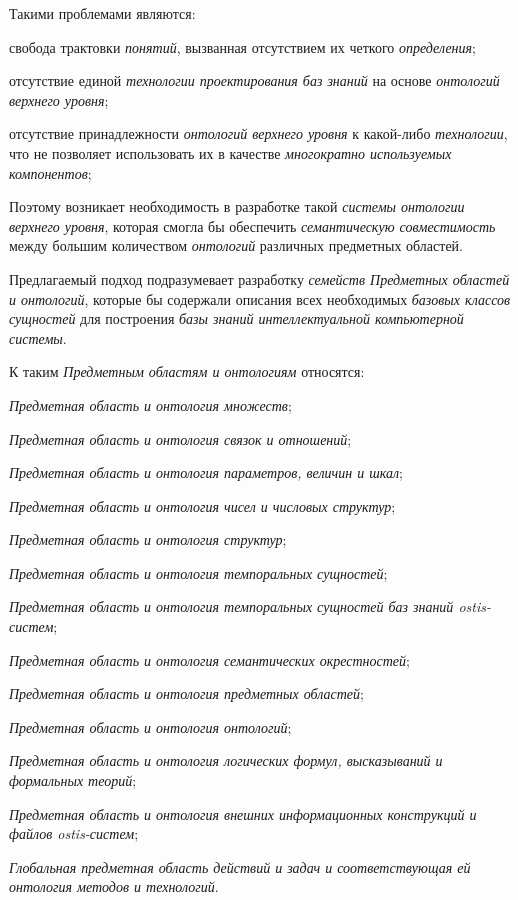 Такими проблемами являются:
\begin{textitemize}
    \item свобода трактовки \textit{понятий}, вызванная отсутствием их четкого \textit{определения};
    \item отсутствие единой \textit{технологии проектирования баз знаний} на основе \textit{онтологий верхнего уровня};
    \item отсутствие принадлежности \textit{онтологий верхнего уровня} к какой-либо \textit{технологии}, что не позволяет использовать их в качестве \textit{многократно используемых компонентов};
\end{textitemize}

Поэтому возникает необходимость в разработке такой \textit{системы онтологии верхнего уровня}, которая смогла бы обеспечить \textit{семантическую совместимость} между большим количеством \textit{онтологий} различных предметных областей.

Предлагаемый подход подразумевает разработку \textit{семейств Предметных областей и онтологий}, которые бы содержали описания всех необходимых \textit{базовых классов сущностей} для построения \textit{базы знаний интеллектуальной компьютерной системы}.

К таким \textit{Предметным областям и онтологиям} относятся:

\begin{textitemize}
\item \textit{Предметная область и онтология множеств};
\item \textit{Предметная область и онтология связок и отношений};
\item \textit{Предметная область и онтология параметров, величин и шкал};
\item \textit{Предметная область и онтология чисел и числовых структур};
\item \textit{Предметная область и онтология структур};
\item \textit{Предметная область и онтология темпоральных сущностей};
\item \textit{Предметная область и онтология темпоральных сущностей баз знаний ostis-систем};
\item \textit{Предметная область и онтология семантических окрестностей};
\item \textit{Предметная область и онтология предметных областей};
\item \textit{Предметная область и онтология онтологий};
\item \textit{Предметная область и онтология логических формул, высказываний и формальных теорий};
\item \textit{Предметная область и онтология внешних информационных конструкций и файлов ostis-систем};
\item \textit{Глобальная предметная область действий и задач и соответствующая ей онтология методов и технологий}.
\end{textitemize}

